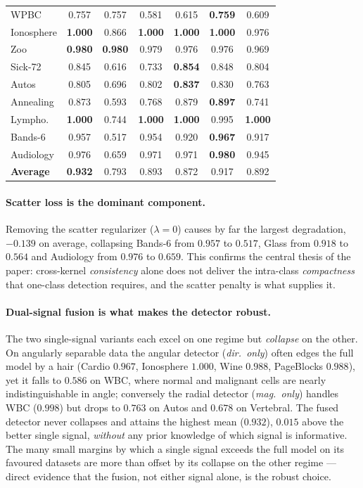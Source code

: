\documentclass[times, review, 10pt]{elsarticle}
\begin{document}
\begin{table}[t]
\begin{tabular}{lcccccc}
WPBC         & 0.757 & 0.757 & 0.581 & 0.615 & \textbf{0.759} & 0.609 \\
Ionosphere   & \textbf{1.000} & 0.866 & \textbf{1.000} & \textbf{1.000} & \textbf{1.000} & 0.976 \\
Zoo          & \textbf{0.980} & \textbf{0.980} & 0.979 & 0.976 & 0.976 & 0.969 \\
Sick-72      & 0.845 & 0.616 & 0.733 & \textbf{0.854} & 0.848 & 0.804 \\
Autos        & 0.805 & 0.696 & 0.802 & \textbf{0.837} & 0.830 & 0.763 \\
Annealing    & 0.873 & 0.593 & 0.768 & 0.879 & \textbf{0.897} & 0.741 \\
Lympho.      & \textbf{1.000} & 0.744 & \textbf{1.000} & \textbf{1.000} & 0.995 & \textbf{1.000} \\
Bands-6      & 0.957 & 0.517 & 0.954 & 0.920 & \textbf{0.967} & 0.917 \\
Audiology    & 0.976 & 0.659 & 0.971 & 0.971 & \textbf{0.980} & 0.945 \\
\midrule
\textbf{Average} & \textbf{0.932} & 0.793 & 0.893 & 0.872 & 0.917 & 0.892 \\
\bottomrule
\end{tabular}
\end{table}

\paragraph{Scatter loss is the dominant component.}
Removing the scatter regularizer ($\lambda=0$) causes by far the largest
degradation, $-0.139$ on average, collapsing Bands-6 from $0.957$ to $0.517$,
Glass from $0.918$ to $0.564$ and Audiology from $0.976$ to $0.659$. This confirms the central thesis of the paper:
cross-kernel \emph{consistency} alone does not deliver the intra-class
\emph{compactness} that one-class detection requires, and the scatter penalty is
what supplies it.

\paragraph{Dual-signal fusion is what makes the detector robust.}
The two single-signal variants each excel on one regime but \emph{collapse} on
the other. On angularly separable data the angular detector (\emph{dir.\ only})
often edges the full model by a hair (Cardio $0.967$, Ionosphere $1.000$, Wine
$0.988$, PageBlocks $0.988$), yet it falls to $0.586$ on WBC, where normal and
malignant cells are nearly indistinguishable in angle; conversely the radial
detector (\emph{mag.\ only}) handles WBC ($0.998$) but drops to $0.763$ on Autos
and $0.678$ on Vertebral. The fused detector never collapses and attains the
highest mean ($0.932$), $0.015$ above the better single signal, \emph{without} any
prior knowledge of which signal is informative. The many small margins by which a
single signal exceeds the full model on its favoured datasets are more than offset
by its collapse on the other regime --- direct evidence that the fusion, not
either signal alone, is the robust choice.
\end{document}
